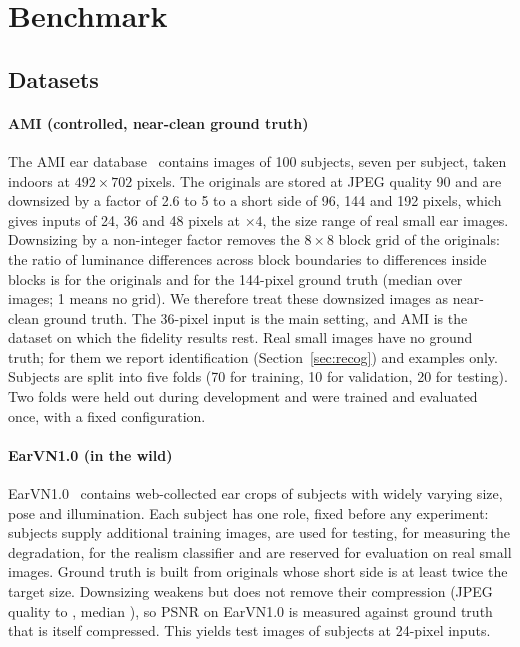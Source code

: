 \section{Benchmark}
\label{sec:benchmark}

\subsection{Datasets}
\paragraph{AMI (controlled, near-clean ground truth)} The AMI ear database~\cite{gonzalez2012ami} contains \NAmiAllImg{} images of 100 subjects, seven per subject, taken indoors at $492\times702$ pixels. The originals are stored at JPEG quality 90 and are downsized by a factor of 2.6 to 5 to a short side of 96, 144 and 192 pixels, which gives inputs of 24, 36 and 48 pixels at $\times4$, the size range of real small ear images. Downsizing by a non-integer factor removes the $8\times8$ block grid of the originals: the ratio of luminance differences across block boundaries to differences inside blocks is \BlockAmiRaw{} for the originals and \BlockAmiGtM{} for the 144-pixel ground truth (median over images; 1 means no grid). We therefore treat these downsized images as near-clean ground truth. The 36-pixel input is the main setting, and AMI is the dataset on which the fidelity results rest. Real small images have no ground truth; for them we report identification (Section~\ref{sec:recog}) and examples only. Subjects are split into five folds (70 for training, 10 for validation, 20 for testing). Two folds were held out during development and were trained and evaluated once, with a fixed configuration.

\paragraph{EarVN1.0 (in the wild)} EarVN1.0~\cite{hoang2019earvn} contains web-collected ear crops of \RoleAll{} subjects with widely varying size, pose and illumination. Each subject has one role, fixed before any experiment: \RoleTrain{} subjects supply additional training images, \RoleTest{} are used for testing, \RoleFit{} for measuring the degradation, \RoleClf{} for the realism classifier and \RoleViewer{} are reserved for evaluation on real small images. Ground truth is built from originals whose short side is at least twice the target size. Downsizing weakens but does not remove their compression (JPEG quality \GtEarvnQMin{} to \GtEarvnQMax{}, median \GtEarvnQMed{}), so PSNR on EarVN1.0 is measured against ground truth that is itself compressed. This yields \NEarvnImg{} test images of \NEarvnSubj{} subjects at 24-pixel inputs.

